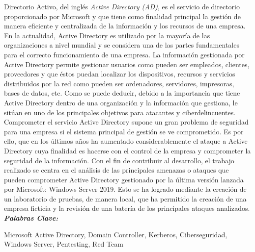 
\setcounter{page}{5}
	

Directorio Activo, del inglés {\it Active Directory (AD)}, es el servicio de directorio proporcionado por Microsoft y que tiene como finalidad principal la gestión de manera eficiente y centralizada de la información y los recursos de una empresa. En la actualidad, Active Directory es utilizado por la mayoría de las organizaciones a nivel mundial y se considera una de las partes fundamentales para el correcto funcionamiento de una empresa. La información gestionada por Active Directory permite gestionar usuarios como pueden ser empleados, clientes,  proveedores y que éstos puedan localizar los dispositivos, recursos y servicios distribuidos por la red como pueden ser ordenadores, servidores, impresoras, bases de datos, etc. Como se puede deducir, debido a la importancia que tiene Active Directory dentro de una organización y la información que gestiona, le sitúan en uno de los principales objetivos para atacantes y ciberdelincuentes. Comprometer el servicio Active Directory supone un gran problema de seguridad para una empresa si el sistema principal de gestión se ve comprometido. Es por ello, que en los últimos años ha aumentado considerablemente el ataque a Active Directory cuya finalidad es hacerse con el control de la empresa y comprometer la seguridad de la información. Con el fin de contribuir al desarrollo, el trabajo realizado se centra en el análisis de las principales amenazas o ataques que pueden comprometer Active Directory gestionado por la última versión lanzada por Microsoft: Windows Server 2019. Esto se ha logrado mediante la creación de un laboratorio de pruebas, de manera local, que ha permitido la creación de una empresa ficticia y la revisión de una batería de los principales ataques analizados. \\

\textit{\textbf{Palabras Clave:}}

Microsoft Active Directory, Domain Controller, Kerberos, Ciberseguridad, Windows Server, Pentesting, Red Team
	
		
\vfill
\newpage %
\thispagestyle{empty}
\mbox{}
